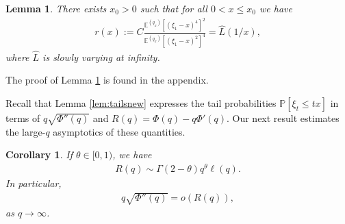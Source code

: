 \documentclass[a4,12pt]{amsart}
\numberwithin{equation}{section}
\newtheorem{cor}[thm]{Corollary}
\newtheorem{lemma}[thm]{Lemma}
\begin{document}
\color{black}



\begin{lemma} \label{lem:condition}
There exists $x_0>0$ such that for all $0 < x \leq x_0$ we have 
\begin{align*}
r(x) :=  C  \frac{ \mathbb{E}^{(q_x)}\left[ (\xi_1 - x)^4 \right]^2 }{\mathbb{E}^{(q_x)}\left[ (\xi_1 - x)^2 \right]^4   } = \hat{L}(1/x),
\end{align*}
where $\hat{L}$ is slowly varying at infinity.
\end{lemma}
The proof of Lemma \ref{lem:condition} is found in the appendix.


Recall that Lemma \ref{lem:tailsnew} expresses the tail probabilities $\mathbb{P}[\xi_t \leq tx]$ in terms of $q\sqrt{\Phi''(q)}$ and $R(q)= \Phi(q) - q \Phi'(q)$. Our next result estimates the large-$q$ asymptotics of these quantities.


\begin{cor}
If $\theta \in [0,1)$, we have
\begin{align} \label{eq:Rish}
    R(q) \sim \Gamma(2-\theta)q^\theta \ell(q).
\end{align}
In particular,
\begin{align} \label{eq:finzi2}
q\sqrt{\Phi''(q)} = o\left(  R(q) \right), 
\end{align}
as $q \to \infty$. 
\end{cor}
\end{document}
